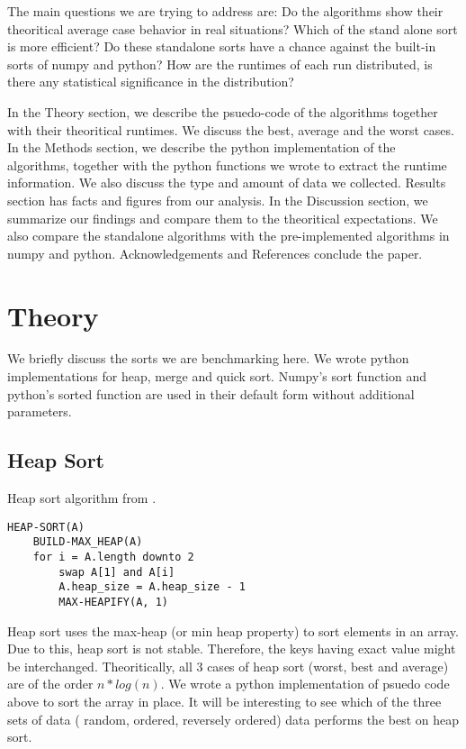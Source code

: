 \documentclass[sigconf,  natbib, screen]{acmart}
\begin{document}
The main questions we are trying to address are: Do the algorithms show their theoritical average case behavior in real situations? 
Which of the stand alone sort is more efficient? Do these standalone sorts have a chance against the built-in sorts of numpy and python?
How are the runtimes of each run distributed, is there any statistical significance in the distribution?

In the Theory section, we describe the psuedo-code of the algorithms together with their theoritical runtimes. We discuss the best, average and the worst cases.  In the Methods section, we describe the python implementation of the algorithms, together with the python functions  we 
wrote to extract the runtime information. We also discuss the type and amount of data we collected. Results section has facts and figures from 
our analysis. In the Discussion section, we summarize our findings and compare them to the theoritical expectations. We also compare the 
standalone algorithms with the pre-implemented algorithms in numpy and python. Acknowledgements and References conclude the paper.


\section{Theory}\label{sec:theory}
We briefly discuss the sorts we are benchmarking here. We wrote
python implementations for heap, merge and quick sort. Numpy's sort function and python's sorted function are used in their default form
without additional parameters.

\subsection{Heap Sort}\label{sec:heap sort}

\begin{listing}
  \caption{Heap sort algorithm from \citet[Ch.~6.4]{CLRS_2009}.}
  \label{lst:heap_algo}

\begin{verbatim}
HEAP-SORT(A)
    BUILD-MAX_HEAP(A)
    for i = A.length downto 2
        swap A[1] and A[i]
        A.heap_size = A.heap_size - 1
        MAX-HEAPIFY(A, 1)
\end{verbatim}
\end{listing}

Heap sort uses the max-heap (or min heap property) to sort elements in an array. Due to this, heap sort is not stable. Therefore, the keys having exact value might be interchanged. Theoritically, all 3 cases of heap sort (worst, best and average)
are of the order $n*log(n)$. We wrote a python implementation of psuedo code above to sort the array in place. It will be interesting to see which of the three sets of data ( random, ordered, reversely ordered) data performs the best on heap sort. 
\end{document}
